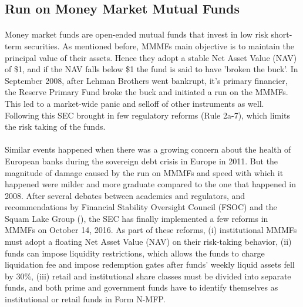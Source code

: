 \documentclass[11pt]{article}
\begin{document}
\subsection{Run on Money Market Mutual Funds}

\paragraph{} Money market funds are open-ended mutual funds that invest in low risk short-term securities. As mentioned before, MMMFs main objective is to maintain the principal value of their assets. Hence they adopt a stable Net Asset Value (NAV) of \$1, and if the NAV falls below \$1 the fund is said to have 'broken the buck'. In September 2008, after Lehman Brothers went bankrupt, it's primary financier, the Reserve Primary Fund broke the buck and initiated a run on the MMMFs. This led to a market-wide panic and selloff of other instruments as well. Following this SEC brought in few regulatory reforms (Rule 2a-7), which limits the risk taking of the funds. 

\paragraph{} Similar events happened when there was a growing concern about the health of European banks during the sovereign debt crisis in Europe in 2011. But the magnitude of damage caused by the run on MMMFs and speed with which it happened were milder and more graduate compared to the one that happened in 2008. After several debates between academics and regulators, and recommendations by Financial Stability Oversight Council (FSOC) and the Squam Lake Group (\cite{french2010squam}), the SEC has finally implemented a few reforms in MMMFs on October 14, 2016. As part of these reforms, (i) institutional MMMFs must adopt a floating Net Asset Value (NAV) on their risk-taking behavior, (ii) funds can impose liquidity restrictions, which allows the funds to charge liquidation fee and impose redemption gates after funds' weekly liquid assets fell by 30\%, (iii) retail and institutional share classes must be divided into separate funds, and both prime and government funds have to identify themselves as institutional or retail funds in Form N-MFP.
\end{document}
